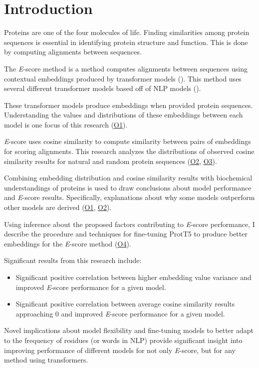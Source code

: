 \chapter{Introduction}
Proteins are one of the four molecules of life. Finding similarities among protein sequences is essential in identifying protein structure and function. This is done by computing alignments between sequences.

The \textit{E}-score method is a method computes alignments between sequences using contextual embeddings produced by \gls{transformer} models (\cite{Ashrafzadeh:2023}). This method uses several different transformer models based off of \gls{NLP} models (\cite{Devlin:2018, Zhenzhong:2020, Liu:2019, Yang:2022, Raffel:2020}).

These transformer models produce embeddings when provided protein sequences. Understanding the values and distributions of these embeddings between each model is one focus of this research (\hyperlink{O1}{O1}).

\textit{E}-score uses cosine similarity to compute similarity between pairs of embeddings for scoring alignments. This research analyzes the distributions of observed cosine similarity results for natural and random protein sequences (\hyperlink{O2}{O2}, \hyperlink{O3}{O3}).

Combining embedding distribution and cosine similarity results with biochemical understandings of proteins is used to draw conclusions about model performance and \textit{E}-score results. Specifically, explanations about why some models outperform other models are derived (\hyperlink{O1}{O1}, \hyperlink{O2}{O2}).

Using inference about the proposed factors contributing to \textit{E}-score performance, I describe the procedure and techniques for fine-tuning ProtT5 to produce better embeddings for the \textit{E}-score method (\hyperlink{O4}{O4}).

\noindent Significant results from this research include:
\begin{itemize}
    \item{Significant positive correlation between higher embedding value variance and improved \textit{E}-score performance for a given model.}
    \item{Significant positive correlation between average cosine similarity results approaching 0 and improved \textit{E}-score performance for a given model.}
\end{itemize}

Novel implications about model flexibility and fine-tuning models to better adapt to the frequency of \glspl{residue} (or words in \gls{NLP}) provide significant insight into improving performance of different models for not only \textit{E}-score, but for any method using \glspl{transformer}.

